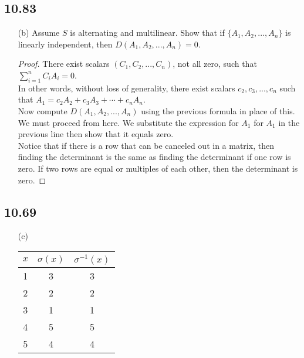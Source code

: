 \documentclass{report}
\begin{document}
\subsection{10.83}
\begin{enumerate}
\item[(b)] Assume $S$ is alternating and multilinear. Show that if $\{A_1,A_2,...,A_n\}$ is linearly independent, then $D(A_1,A_2,...,A_n) = 0$. 
\begin{proof}
There exist scalars $(C_1,C_2,...,C_n)$, not all zero, such that $\sum_{i=1}^nC_iA_i = 0$.\\
In other words, without loss of generality, there exist scalars $c_2,c_3,...,c_n$ such that $A_1=c_2A_2+c_3A_3+\cdots + c_nA_n$.\\
Now compute $D(A_1,A_2,...,A_n)$ using the previous formula in place of this.\\
We must proceed from here. We substitute the expression for $A_1$ for $A_1$ in the previous line then show that it equals zero.\\
Notice that if there is a row that can be canceled out in a matrix, then finding the determinant is the same as finding the determinant if one row is zero. If two rows are equal or multiples of each other, then the determinant is zero.
\end{proof}
\end{enumerate}
\subsection{10.69}
\begin{enumerate}
\item[(c)]
\begin{tabular}{c|c|c}
$x$ & $\sigma(x)$ & $\sigma^{-1}(x)$\\
\hline
1&3&3\\
2&2&2\\
3&1&1\\
4&5&5\\
5&4&4\\
\end{tabular}
\end{enumerate}
\end{document}
